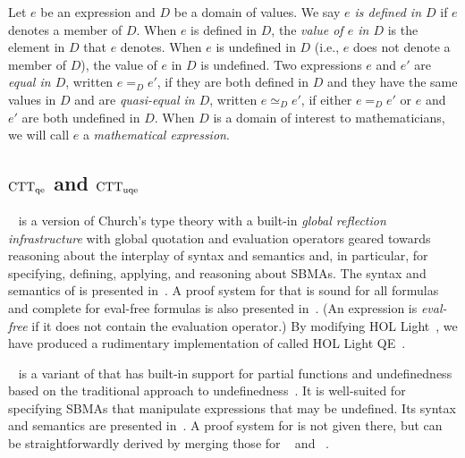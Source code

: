 \documentclass[fleqn]{llncs}
\begin{document}
Let $e$ be an expression and $D$ be a domain of values.  We say
\emph{$e$ is defined in $D$} if $e$ denotes a member of $D$.  When $e$
is defined in $D$, the \emph{value of $e$ in $D$} is the element in
$D$ that $e$ denotes.  When $e$ is undefined in $D$ (i.e., $e$ does
not denote a member of $D$), the value of $e$ in $D$ is undefined.
Two expressions $e$ and $e'$ are \emph{equal in $D$}, written $e =_D
e'$, if they are both defined in $D$ and they have the same values in
$D$ and are \emph{quasi-equal in $D$}, written $e \simeq_D e'$, if
either $e =_D e'$ or $e$ and $e'$ are both undefined in $D$. When $D$
is a domain of interest to mathematicians, we will call $e$ a
\emph{mathematical expression}.

\subsection{${\rm CTT}_{\rm qe}$ and ${\rm CTT}_{\rm uqe}$}

{\churchqe}~\cite{Farmer18} is a version of Church's type theory with
a built-in \emph{global reflection infrastructure} with global
quotation and evaluation operators geared towards reasoning
about the interplay of syntax and semantics and, in particular, for
specifying, defining, applying, and reasoning about SBMAs.  The syntax
and semantics of {\churchqe} is presented in~\cite{Farmer18}.  A proof
system for {\churchqe} that is sound for all formulas and complete for
eval-free formulas is also presented in~\cite{Farmer18}.  (An
expression is \emph{eval-free} if it does not contain the evaluation
operator.) By modifying HOL Light~\cite{Harrison09}, we have produced
a rudimentary implementation of {\churchqe} called HOL Light
QE~\cite{CaretteFarmerLaskowski18}.

{\churchuqe}~\cite{Farmer17} is a variant of {\churchqe} that has
built-in support for partial functions and undefinedness based on the
traditional approach to undefinedness~\cite{Farmer04}.  It is
well-suited for specifying SBMAs that manipulate expressions that may
be undefined.  Its syntax and semantics are presented in~\cite{Farmer17}.  A
proof system for {\churchuqe} is not given there, but can be straightforwardly
derived by merging those for {\churchqe}~\cite{Farmer18}
and {\qzerou}~\cite{Farmer08a}.
\end{document}
